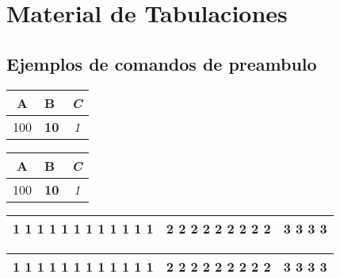 \documentclass [spanish,12pt]{article}
\begin{document}
\section{Material de Tabulaciones}

\subsection{Ejemplos de comandos de preambulo}

\begin{center}

\begin{tabular}{| >{\large}c | >{\bfseries}l | >{\itshape} c |}
\hline A & B & C \\
\hline 100 & 10 & 1 \\
\hline
\end{tabular}

\end{center}


\vspace{.1in}

\begin{center}

\setlength{\extrarowheight}{4pt}
\begin{tabular}{| >{\large}c | >{\bfseries}l | >{\itshape} c |}
\hline A & B & C \\
\hline 100 & 10 & 1 \\
\hline
\end{tabular}

\end{center}

\vspace{.1in}

\begin{center}
\begin{tabular}{|p{2cm}|p{1cm}|p{1cm}|}
\hline 1 1 1 1 1 1 1 1 1 1 1 1  &
       2 2 2 2 2 2 2 2 2        & 3 3 3 3 \\
\hline
\end{tabular} 

\end{center}

\vspace{.1in}

\begin{center}
\begin{tabular}{|m{1.2cm}|m{1cm}|m{1cm}|}
\hline 1 1 1 1 1 1 1 1 1 1 1 1  &
       2 2 2 2 2 2 2 2 2        & 3 3 3 3 \\
\hline
\end{tabular} 

\end{center}
\end{document}
